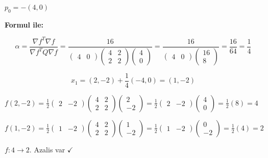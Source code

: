 \documentclass[12pt,a4paper]{article}
\theoremstyle{definition}
\theoremstyle{remark}
\begin{document}
$p_0 = -(4, 0)$

\textbf{Formul ile:}

\[
\alpha = \frac{\nabla f^T \nabla f}{\nabla f^T Q \nabla f} = \frac{16}{\begin{pmatrix} 4 & 0 \end{pmatrix} \begin{pmatrix} 4 & 2 \\ 2 & 2 \end{pmatrix} \begin{pmatrix} 4 \\ 0 \end{pmatrix}} = \frac{16}{\begin{pmatrix} 4 & 0 \end{pmatrix} \begin{pmatrix} 16 \\ 8 \end{pmatrix}} = \frac{16}{64} = \frac{1}{4}
\]

\[
x_1 = (2,-2) + \frac{1}{4}(-4, 0) = (1, -2)
\]

$f(2,-2) = \frac{1}{2}\begin{pmatrix} 2 & -2 \end{pmatrix} \begin{pmatrix} 4 & 2 \\ 2 & 2 \end{pmatrix} \begin{pmatrix} 2 \\ -2 \end{pmatrix} = \frac{1}{2}\begin{pmatrix} 2 & -2 \end{pmatrix} \begin{pmatrix} 4 \\ 0 \end{pmatrix} = \frac{1}{2}(8) = 4$

$f(1,-2) = \frac{1}{2}\begin{pmatrix} 1 & -2 \end{pmatrix} \begin{pmatrix} 4 & 2 \\ 2 & 2 \end{pmatrix} \begin{pmatrix} 1 \\ -2 \end{pmatrix} = \frac{1}{2}\begin{pmatrix} 1 & -2 \end{pmatrix} \begin{pmatrix} 0 \\ -2 \end{pmatrix} = \frac{1}{2}(4) = 2$

$f: 4 \rightarrow 2$. Azalis var $\checkmark$
\end{document}

